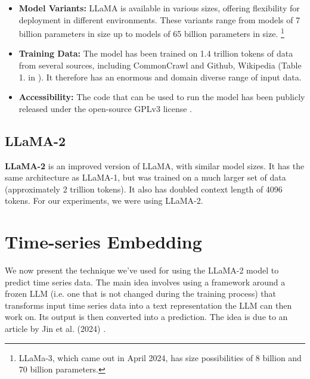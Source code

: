 \begin{itemize}
	\item \textbf{Model Variants:} LLaMA is available in various sizes, offering flexibility for deployment in different environments. These variants range from models of 7 billion parameters in size up to models of 65 billion parameters in size. \footnote{LLaMa-3, which came out in April 2024, has size possibilities of 8 billion and 70 billion parameters.}

	\item \textbf{Training Data:} The model has been trained on 1.4 trillion tokens of data from several sources, including CommonCrawl and Github, Wikipedia (Table 1. in \cite{llama}). It therefore has an enormous and domain diverse range of input data.


	\item \textbf{Accessibility:} The code that can be used to run the model has been publicly released under the open-source GPLv3 license \cite{llama_code}.
\end{itemize}

\subsection{LLaMA-2}
\textbf{LLaMA-2} \cite{llama2} is an improved version of LLaMA, with similar model sizes. It has the same architecture as LLaMA-1, but was trained on a much larger set of data (approximately 2 trillion tokens). It also has doubled context length of 4096 tokens. For our experiments, we were using LLaMA-2.

\section{Time-series Embedding}
We now present the technique we've used for using the LLaMA-2 model to predict time series data.
The main idea involves using a framework around a frozen LLM (i.e. one that is not changed during the training process) that transforms input time series data into a text representation the LLM can then work on. Its output is then converted into a prediction. The idea is due to an article by Jin et al. (2024) \cite{reprogramming_llm}.


